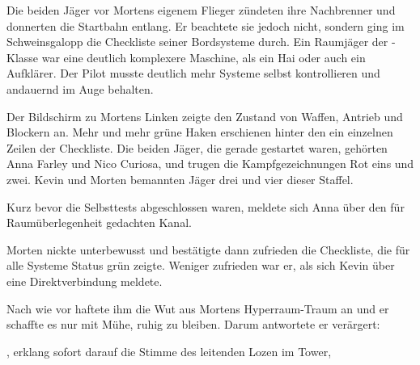 Die beiden Jäger vor Mortens eigenem Flieger zündeten ihre Nachbrenner und donnerten die Startbahn entlang. Er beachtete sie jedoch nicht, sondern ging im Schweinsgalopp die Checkliste seiner Bordsysteme durch. Ein Raumjäger der -Klasse war eine deutlich komplexere Maschine, als ein Hai oder auch ein Aufklärer. Der Pilot musste deutlich mehr Systeme selbst kontrollieren und andauernd im Auge behalten.

\par

Der Bildschirm zu Mortens Linken zeigte den Zustand von Waffen, Antrieb und Blockern an. Mehr und mehr grüne Haken erschienen hinter den ein einzelnen Zeilen der Checkliste. Die beiden Jäger, die gerade gestartet waren, gehörten Anna Farley und Nico Curiosa, und trugen die Kampfgezeichnungen Rot eins und zwei. Kevin und Morten bemannten Jäger drei und vier dieser Staffel.

\par

Kurz bevor die Selbsttests abgeschlossen waren, meldete sich Anna über den für Raumüberlegenheit gedachten Kanal. 

\par

Morten nickte unterbewusst und bestätigte dann zufrieden die Checkliste, die für alle Systeme Status grün zeigte. Weniger zufrieden war er, als sich Kevin über eine Direktverbindung meldete. 

\par

Nach wie vor haftete ihm die Wut aus Mortens Hyperraum-Traum an und er schaffte es nur mit Mühe, ruhig zu bleiben. Darum antwortete er verärgert: 

\par

, erklang sofort darauf die Stimme des leitenden Lozen im Tower, 

